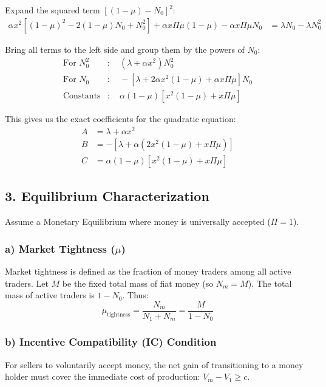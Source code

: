 \documentclass[11pt, a4paper]{article}
\begin{document}
Expand the squared term $[(1 - \mu) - N_0]^2$:
\begin{align*}
    \alpha x^2 \left[ (1 - \mu)^2 - 2(1 - \mu)N_0 + N_0^2 \right] + \alpha x\Pi \mu (1 - \mu) - \alpha x\Pi \mu N_0 &= \lambda N_0 - \lambda N_0^2
\end{align*}

Bring all terms to the left side and group them by the powers of $N_0$:
\begin{align*}
    \text{For } N_0^2&: \quad (\lambda + \alpha x^2) N_0^2 \\
    \text{For } N_0&: \quad - \left[ \lambda + 2\alpha x^2(1 - \mu) + \alpha x\Pi\mu \right] N_0 \\
    \text{Constants}&: \quad \alpha(1 - \mu) \left[ x^2(1 - \mu) + x\Pi\mu \right]
\end{align*}

This gives us the exact coefficients for the quadratic equation:
\begin{align*}
    A &= \lambda + \alpha x^2 \\
    B &= -\left[ \lambda + \alpha(2x^2(1 - \mu) + x\Pi\mu) \right] \\
    C &= \alpha(1 - \mu) \left[ x^2(1 - \mu) + x\Pi\mu \right]
\end{align*}

\subsection*{3. Equilibrium Characterization}
Assume a Monetary Equilibrium where money is universally accepted ($\Pi = 1$).

\subsubsection*{a) Market Tightness ($\mu$)}
Market tightness is defined as the fraction of money traders among all active traders. Let $M$ be the fixed total mass of fiat money (so $N_m = M$). The total mass of active traders is $1 - N_0$. Thus:
\begin{equation}
    \mu_{\text{tightness}} = \frac{N_m}{N_1 + N_m} = \frac{M}{1 - N_0}
\end{equation}

\subsubsection*{b) Incentive Compatibility (IC) Condition}
For sellers to voluntarily accept money, the net gain of transitioning to a money holder must cover the immediate cost of production: $V_m - V_1 \ge c$.
\end{document}
